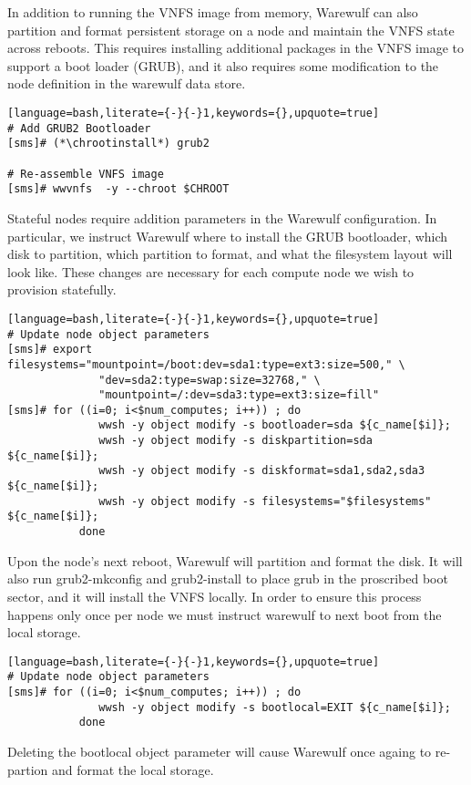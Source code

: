In addition to running the VNFS image from memory, Warewulf can also partition
and format persistent storage on a node and maintain the VNFS state across
reboots. This requires installing additional packages in the VNFS image to
support a boot loader (GRUB), and it also requires some modification to the
node definition in the warewulf data store. 

\begin{lstlisting}[language=bash,literate={-}{-}1,keywords={},upquote=true]
# Add GRUB2 Bootloader
[sms]# (*\chrootinstall*) grub2

# Re-assemble VNFS image
[sms]# wwvnfs  -y --chroot $CHROOT
\end{lstlisting}

Stateful nodes require addition parameters in the Warewulf configuration. In
particular, we instruct Warewulf where to install the GRUB bootloader, which
disk to partition, which partition to format, and what the filesystem layout
will look like. These changes are necessary for each compute node we wish to
provision statefully.

\begin{lstlisting}[language=bash,literate={-}{-}1,keywords={},upquote=true]
# Update node object parameters
[sms]# export filesystems="mountpoint=/boot:dev=sda1:type=ext3:size=500," \
              "dev=sda2:type=swap:size=32768," \
              "mountpoint=/:dev=sda3:type=ext3:size=fill"
[sms]# for ((i=0; i<$num_computes; i++)) ; do 
              wwsh -y object modify -s bootloader=sda ${c_name[$i]};
              wwsh -y object modify -s diskpartition=sda ${c_name[$i]};
              wwsh -y object modify -s diskformat=sda1,sda2,sda3 ${c_name[$i]};
              wwsh -y object modify -s filesystems="$filesystems" ${c_name[$i]};
           done
\end{lstlisting}

Upon the node's next reboot, Warewulf will partition and format the disk. It
will also run grub2-mkconfig and grub2-install to place grub in the proscribed
boot sector, and it will install the VNFS locally. In order to ensure this 
process happens only once per node we must instruct warewulf to next boot from 
the local storage.

\begin{lstlisting}[language=bash,literate={-}{-}1,keywords={},upquote=true]
# Update node object parameters
[sms]# for ((i=0; i<$num_computes; i++)) ; do 
              wwsh -y object modify -s bootlocal=EXIT ${c_name[$i]};
           done
\end{lstlisting}

Deleting the bootlocal object parameter will cause Warewulf once againg to
re-partion and format the local storage.
